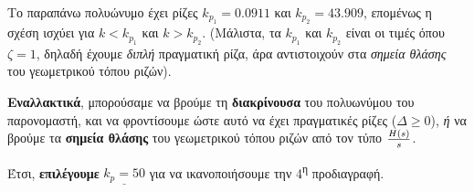 \documentclass[11pt,a4paper,notitlepage,fleqn,final]{article}
\begin{document}
\begin{exercise}
\begin{itemize}
	Το παραπάνω πολυώνυμο έχει ρίζες \( k_{p_1} = 0.0911 \) και \( k_{p_2} = 43.909 \),
	επομένως η σχέση ισχύει για \( k < k_{p_1} \) και \( k > k_{p_2} \). (Μάλιστα, τα
	\( k_{p_1} \) και \( k_{p_2} \) είναι οι τιμές όπου \( ζ=1 \), δηλαδή έχουμε \textit{διπλή} πραγματική ρίζα, άρα αντιστοιχούν στα \textit{σημεία θλάσης} του
	γεωμετρικού τόπου ριζών).
	
	\textbf{Εναλλακτικά}, μπορούσαμε να βρούμε τη \textbf{διακρίνουσα} του πολυωνύμου
	του παρονομαστή, και να φροντίσουμε ώστε αυτό να έχει πραγματικές ρίζες (\( Δ\geq0 \)),
	\textit{ή} να βρούμε τα \textbf{σημεία θλάσης} του γεωμετρικού τόπου ριζών από τον
	τύπο \( \frac{H(s)}{s} \).
	
	Έτσι, \textbf{επιλέγουμε} \( \underline{k_p = 50} \) για να ικανοποιήσουμε την 4\textsuperscript{η} προδιαγραφή.
\end{itemize}

\hspace{0pt}
\end{exercise}
\end{document}
